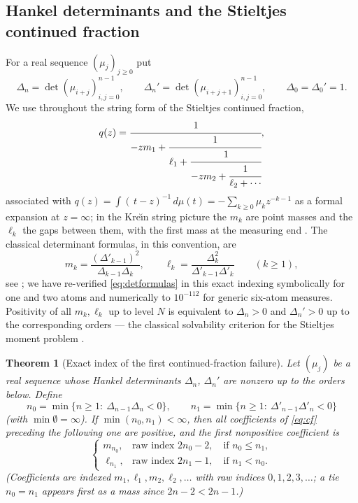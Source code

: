 \documentclass[11pt]{amsart}
\newtheorem{theorem}{Theorem}[section]
\theoremstyle{definition}
\theoremstyle{remark}
\newcommand{\dd}{\,d}
\begin{document}
\subsection{Hankel determinants and the Stieltjes continued fraction}

For a real sequence $(\mu_j)_{j\ge0}$ put
\[
\Delta_n=\det(\mu_{i+j})_{i,j=0}^{n-1},
\qquad
\Delta_n'=\det(\mu_{i+j+1})_{i,j=0}^{n-1},
\qquad
\Delta_0=\Delta_0'=1 .
\]
We use throughout the string form of the Stieltjes continued fraction,
\begin{equation}\label{eq:cf}
q(z)=
\cfrac{1}{-zm_1+\cfrac{1}{\ell_1+\cfrac{1}{-zm_2+\cfrac{1}{\ell_2+\cdots}}}} ,
\end{equation}
associated with $q(z)=\int(\,t-z)^{-1}\dd\mu(t)=-\sum_{k\ge0}\mu_kz^{-k-1}$
as a formal expansion at $z=\infty$; in the Kre\u{\i}n string picture the
$m_k$ are point masses and the $\ell_k$ the gaps between them, with the first
mass at the measuring end \cite{KacKrein,GK}. The classical determinant
formulas, in this convention, are
\begin{equation}\label{eq:detformulas}
m_k=\frac{(\Delta'_{k-1})^2}{\Delta_{k-1}\Delta_k},
\qquad
\ell_k=\frac{\Delta_k^2}{\Delta'_{k-1}\Delta'_k}
\qquad(k\ge1),
\end{equation}
see \cite{Stieltjes,Wall,GK}; we have re-verified
\eqref{eq:detformulas} in this exact indexing symbolically for one and two
atoms and numerically to $10^{-112}$ for generic six-atom measures.
Positivity of all $m_k,\ell_k$ up to level $N$ is equivalent to
$\Delta_n>0$ and $\Delta_n'>0$ up to the corresponding orders --- the
classical solvability criterion for the Stieltjes moment problem
\cite{Stieltjes,Schmudgen}.

\begin{theorem}[Exact index of the first continued-fraction failure]
\label{thm:cfindex}
Let $(\mu_j)$ be a real sequence whose Hankel determinants $\Delta_n$,
$\Delta_n'$ are nonzero up to the orders below. Define
\[
n_0=\min\{n\ge1:\ \Delta_{n-1}\Delta_n<0\},
\qquad
n_1=\min\{n\ge1:\ \Delta'_{n-1}\Delta'_n<0\}
\]
(with $\min\emptyset=\infty$). If $\min(n_0,n_1)<\infty$, then all
coefficients of \eqref{eq:cf} preceding the following one are positive, and
the first nonpositive coefficient is
\[
\begin{cases}
m_{n_0}, & \text{raw index } 2n_0-2,\quad\text{if } n_0\le n_1,\\[2pt]
\ell_{n_1}, & \text{raw index } 2n_1-1,\quad\text{if } n_1<n_0 .
\end{cases}
\]
(Coefficients are indexed $m_1,\ell_1,m_2,\ell_2,\dots$ with raw indices
$0,1,2,3,\dots$; a tie $n_0=n_1$ appears first as a mass since $2n-2<2n-1$.)
\end{theorem}
\end{document}

